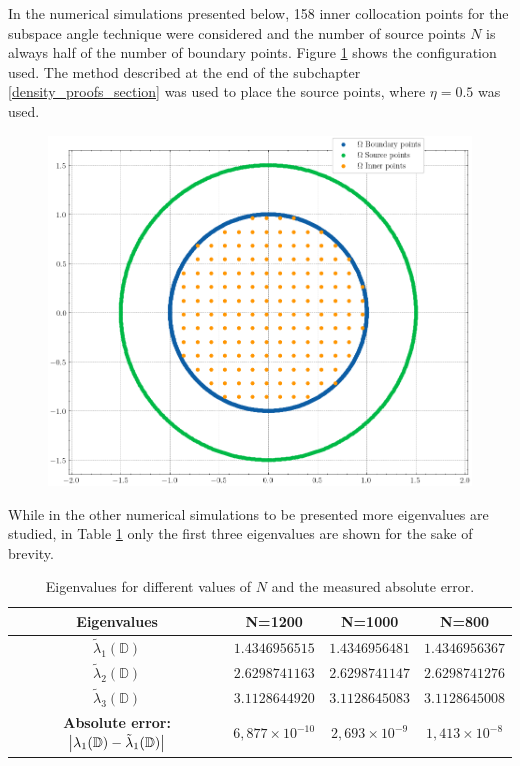 In the numerical simulations presented below, 158 inner collocation points for the subspace angle technique were considered and the number of source points \(N\) is always half of the number of boundary points. Figure \ref{dirak_disk_col_m0} shows the configuration used. The method described at the end of the subchapter \ref{density_proofs_section} was used to place the source points, where \(\eta=0.5\) was used. 

\begin{figure}[!htb]
    \centering
    \includegraphics[width=0.5\linewidth]{Images/Dirac/circle_m_0_col_points_158_inner_eta_05.png}
    \label{dirak_disk_col_m0}
\end{figure}

While in the other numerical simulations to be presented more eigenvalues are studied, in Table \ref{tab:eigenvalues_disk_val} only the first three eigenvalues are shown for the sake of brevity.

\begin{table}[htbp]
    \centering
    \begin{tabular}{cccc}
        \toprule
        \textbf{Eigenvalues} & \textbf{N=1200} & \textbf{N=1000} & \textbf{N=800} \\
        \midrule
        \(\tilde{\lambda}_1(\mathbb{D})\) & $1.4346956515$ & $1.4346956481$ & $1.4346956367$ \\
        \(\tilde{\lambda}_2(\mathbb{D})\) & $2.6298741163$ & $2.6298741147$ & $2.6298741276$ \\
        \(\tilde{\lambda}_3(\mathbb{D})\) & $3.1128644920$ & $3.1128645083$ & $3.1128645008$ \\
        \midrule
        \textbf{Absolute error: } \(\abs{\lambda_1(\mathbb{D}) - \tilde{\lambda}_1(\mathbb{D})}\) & $6,877\times 10^{-10}$ & $2,693\times 10^{-9}$ & $1,413\times 10^{-8}$ \\
        \bottomrule
    \end{tabular}
    \caption{Eigenvalues for different values of \(N\) and the measured absolute error.}
    \label{tab:eigenvalues_disk_val}
\end{table}

